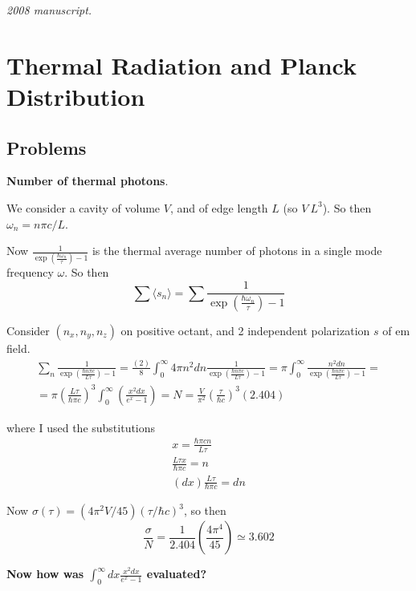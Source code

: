 \noindent\textit{2008 manuscript.}

\section{Thermal Radiation and Planck Distribution}

\subsection*{Problems}

 \textbf{Number of thermal photons}.  

We consider a cavity of volume $V$, and of edge length $L$ (so $V ~ L^3$).  So then $\omega_n = n \pi c/L$.  

Now $\frac{1}{ \exp{ \left(  \frac{ \hbar \omega_n}{ \tau } \right) } - 1 }$ is the thermal average number of photons in a single mode frequency $\omega$.  So then
\[
\sum \langle s_n \rangle = \sum \frac{1}{ \exp{ \left( \frac{ \hbar \omega_n }{\tau} \right)} - 1 }
\]

Consider $(n_x, n_y, n_z)$ on positive octant, and 2 independent polarization $s$ of em field.  
\[
\begin{gathered}
  \sum_n \frac{1}{ \exp{ \left( \frac{ \hbar n \pi c}{ L \tau} \right) } - 1 } = \frac{ (2)}{ 8 } \int_0^{\infty} 4 \pi n^2 dn \frac{1}{ \exp{ \left( \frac{ \hbar n \pi c}{ L \tau } \right)} - 1 } = \pi \int_0^{\infty} \frac{ n^2 dn }{ \exp{ \left( \frac{ \hbar n \pi c}{ L \tau} \right)} - 1 } = \\
  = \pi \left( \frac{ L \tau }{ \hbar \pi c }\right)^3 \int_0^{\infty} \left( \frac{ x^2  dx}{ e^x - 1 } \right) = \boxed{ N = \frac{ V }{ \pi^2 } \left( \frac{ \tau }{ \hbar c} \right)^3 (2.404) }
\end{gathered}
\]

where I used the substitutions \[ \begin{gathered} x = \frac{ \hbar \pi c n}{ L \tau } \\ \frac{ L \tau x }{ \hbar \pi c} = n \\ (dx) \frac{ L \tau }{ \hbar \pi c} = dn \end{gathered} \]

Now $\sigma(\tau) = (4 \pi^2 V/ 45)(\tau / \hbar c)^3$, so then 
\[
\frac{ \sigma}{ N} = \frac{1}{2.404} \left( \frac{ 4 \pi^4}{ 45 } \right) \simeq \boxed{ 3.602 }
\]

\textbf{Now how was $\int_0^{\infty} dx \frac{ x^2 dx }{ e^x - 1 }$ evaluated?}  








